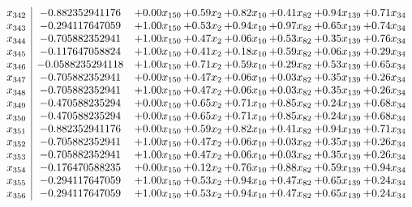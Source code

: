 \documentclass[8pt]{article}
\begin{document}
\[\begin{array}{c| c c@{\hskip 2pt} c@{\hskip 2pt} c@{\hskip 2pt} c@{\hskip 2pt} c@{\hskip 2pt} c@{\hskip 2pt} }
 x_{342}   &  -0.882352941176 & +  0.00 x_{150} & +  0.59 x_{2} & +  0.82 x_{10} & +  0.41 x_{82} & +  0.94 x_{139} & +  0.71 x_{34}\\
 x_{343}   &  -0.294117647059 & +  1.00 x_{150} & +  0.53 x_{2} & +  0.94 x_{10} & +  0.97 x_{82} & +  0.65 x_{139} & +  0.74 x_{34}\\
 x_{344}   &  -0.705882352941 & +  1.00 x_{150} & +  0.47 x_{2} & +  0.06 x_{10} & +  0.53 x_{82} & +  0.35 x_{139} & +  0.76 x_{34}\\
 x_{345}   &  -0.117647058824 & +  1.00 x_{150} & +  0.41 x_{2} & +  0.18 x_{10} & +  0.59 x_{82} & +  0.06 x_{139} & +  0.29 x_{34}\\
 x_{346}   &  -0.0588235294118 & +  1.00 x_{150} & +  0.71 x_{2} & +  0.59 x_{10} & +  0.29 x_{82} & +  0.53 x_{139} & +  0.65 x_{34}\\
 x_{347}   &  -0.705882352941 & +  0.00 x_{150} & +  0.47 x_{2} & +  0.06 x_{10} & +  0.03 x_{82} & +  0.35 x_{139} & +  0.26 x_{34}\\
 x_{348}   &  -0.705882352941 & +  1.00 x_{150} & +  0.47 x_{2} & +  0.06 x_{10} & +  0.03 x_{82} & +  0.35 x_{139} & +  0.26 x_{34}\\
 x_{349}   &  -0.470588235294 & +  0.00 x_{150} & +  0.65 x_{2} & +  0.71 x_{10} & +  0.85 x_{82} & +  0.24 x_{139} & +  0.68 x_{34}\\
 x_{350}   &  -0.470588235294 & +  0.00 x_{150} & +  0.65 x_{2} & +  0.71 x_{10} & +  0.85 x_{82} & +  0.24 x_{139} & +  0.68 x_{34}\\
 x_{351}   &  -0.882352941176 & +  0.00 x_{150} & +  0.59 x_{2} & +  0.82 x_{10} & +  0.41 x_{82} & +  0.94 x_{139} & +  0.71 x_{34}\\
 x_{352}   &  -0.705882352941 & +  1.00 x_{150} & +  0.47 x_{2} & +  0.06 x_{10} & +  0.03 x_{82} & +  0.35 x_{139} & +  0.26 x_{34}\\
 x_{353}   &  -0.705882352941 & +  1.00 x_{150} & +  0.47 x_{2} & +  0.06 x_{10} & +  0.03 x_{82} & +  0.35 x_{139} & +  0.26 x_{34}\\
 x_{354}   &  -0.176470588235 & +  0.00 x_{150} & +  0.12 x_{2} & +  0.76 x_{10} & +  0.88 x_{82} & +  0.59 x_{139} & +  0.94 x_{34}\\
 x_{355}   &  -0.294117647059 & +  1.00 x_{150} & +  0.53 x_{2} & +  0.94 x_{10} & +  0.47 x_{82} & +  0.65 x_{139} & +  0.24 x_{34}\\
 x_{356}   &  -0.294117647059 & +  1.00 x_{150} & +  0.53 x_{2} & +  0.94 x_{10} & +  0.47 x_{82} & +  0.65 x_{139} & +  0.24 x_{34}\\

\end{array}\]
\end{document}
